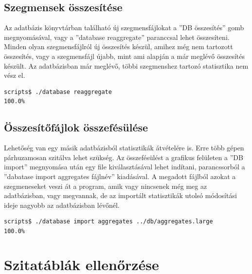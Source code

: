 \subsection{Szegmensek összesítése}

Az adatbázis könyvtárban
található új szegmensfájlokat a ''DB összesítés'' gomb megnyomásával,
vagy a ''database reaggregate'' paranccsal lehet összesíteni.
Minden olyan szegmensfájlról új összesítés készül,
amihez még nem tartozott összesítés, vagy a szegmensfájl
újabb, mint ami alapján a már meglévő összesítés készült.
Az adatbázisban már meglévő, többi szegmenshez tartozó statisztika nem vész el.

\begin{lstlisting}[language=bash]
scripts$ ./database reaggregate
100.0%
\end{lstlisting}

\subsection{Összesítőfájlok összefésülése}

Lehetőség van egy másik adatbázisból statisztikák átvételére is.
Erre több gépen párhuzamosan szitálva lehet szükség.
Az összefésülést a grafikus felületen a ''DB import'' megnyomása után
egy file kiválasztásával lehet indítani, parancssorból a ''dabatase import aggregates fájlnév''
kiadásával. A megadott fájlból azokat a szegmeneseket veszi át a program,
amik vagy nincsenek még meg az adatbázisban, vagy megvannak, de az importált
statisztikák utolsó módosítási ideje nagyobb az adatbázisban lévőnél.

\begin{lstlisting}[language=bash]
scripts$ ./database import aggregates ../db/aggregates.large
100.0%
\end{lstlisting}


\section{Szitatáblák ellenőrzése}

